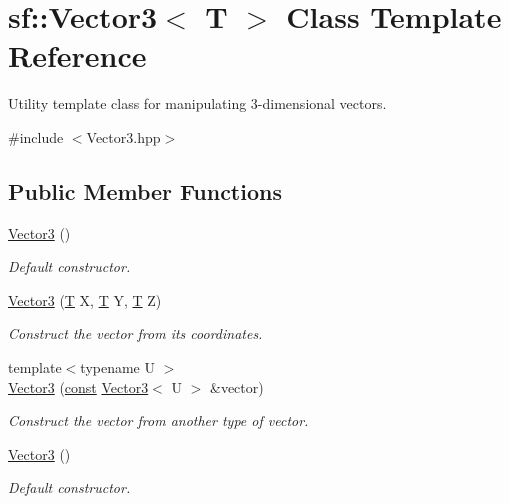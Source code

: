 \hypertarget{classsf_1_1_vector3}{\section{sf\-:\-:Vector3$<$ T $>$ Class Template Reference}
\label{classsf_1_1_vector3}
}


Utility template class for manipulating 3-\/dimensional vectors.  




{\ttfamily \#include $<$Vector3.\-hpp$>$}

\subsection*{Public Member Functions}
\begin{DoxyCompactItemize}
\item 
\hyperlink{classsf_1_1_vector3_aee8be1985c6e45e381ad4071265636f9}{Vector3} ()
\begin{DoxyCompactList}\small\item\em Default constructor. \end{DoxyCompactList}\item 
\hyperlink{classsf_1_1_vector3_a99ed75b68f58adfa3e9fa0561b424bf6}{Vector3} (\hyperlink{curses_8priv_8h_a5ef253115820acf7d27f3c5c3b02a0f0}{T} X, \hyperlink{curses_8priv_8h_a5ef253115820acf7d27f3c5c3b02a0f0}{T} Y, \hyperlink{curses_8priv_8h_a5ef253115820acf7d27f3c5c3b02a0f0}{T} Z)
\begin{DoxyCompactList}\small\item\em Construct the vector from its coordinates. \end{DoxyCompactList}\item 
{\footnotesize template$<$typename U $>$ }\\\hyperlink{classsf_1_1_vector3_adb2b2e150025e97ccfa96219bbed59d1}{Vector3} (\hyperlink{term__entry_8h_a57bd63ce7f9a353488880e3de6692d5a}{const} \hyperlink{classsf_1_1_vector3}{Vector3}$<$ U $>$ \&vector)
\begin{DoxyCompactList}\small\item\em Construct the vector from another type of vector. \end{DoxyCompactList}\item 
\hyperlink{classsf_1_1_vector3_aee8be1985c6e45e381ad4071265636f9}{Vector3} ()
\begin{DoxyCompactList}\small\item\em Default constructor. \end{DoxyCompactList}\item 

\end{DoxyCompactItemize}
